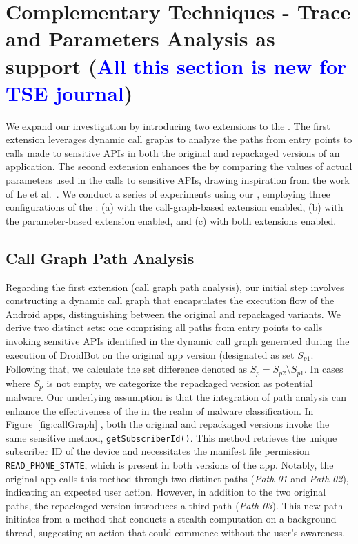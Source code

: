 \section{Complementary Techniques - Trace and Parameters Analysis as \mas support (\textcolor{blue}{All this section is new for TSE journal})}\label{sec:complementary}



We expand our investigation by introducing two extensions to the \mas. The first extension leverages dynamic call graphs
to analyze the paths from entry points to calls made to sensitive APIs in both the original and repackaged versions of an application.
The second extension enhances the \mas by comparing the values of actual parameters used in the calls to sensitive APIs,
drawing inspiration from the work of Le et al.~\cite{le2018towards}. We conduct a series of experiments using our \cds,
employing three configurations of the \mas: (a) with the call-graph-based extension enabled,
(b) with the parameter-based extension enabled, and (c) with both extensions enabled.

\subsection{Call Graph Path Analysis}

Regarding the first extension (call graph path analysis), our initial step involves constructing a
dynamic call graph that encapsulates the execution flow of the Android apps,
distinguishing between the original and repackaged variants. We derive two distinct sets:
one comprising all paths from entry points to calls invoking sensitive APIs identified in the dynamic call graph generated during the execution of
DroidBot on the original app version (designated as set $S_{p1}$.
Following that, we calculate the set difference denoted as $S_p = S_{p2} \setminus S_{p1}$.
In cases where $S_p$ is not empty, we categorize the repackaged version as potential malware.
Our underlying assumption is that the integration of path analysis can enhance the effectiveness of
the \mas in the realm of malware classification.
In Figure~\ref{fig:callGraph} , both the original and repackaged
versions invoke the same sensitive method, \texttt{getSubscriberId()}.
This method retrieves the unique subscriber ID of the device and necessitates the manifest file
permission \texttt{READ\_PHONE\_STATE}, which is present in both versions of the app.
Notably, the original app calls this method through two distinct paths (\emph{Path 01} and \emph{Path 02}),
indicating an expected user action. However, in addition to the two original paths,
the repackaged version introduces a third path (\emph{Path 03}). This new path initiates
from a method that conducts a stealth computation on a background thread, suggesting an action that could
commence without the user's awareness.



